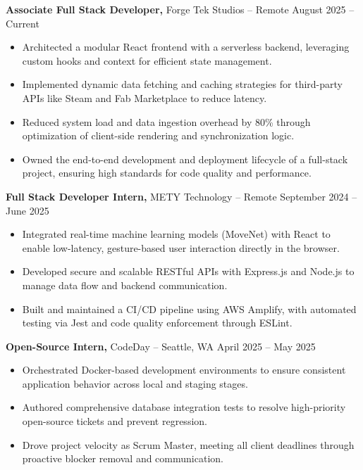 \documentclass[11pt]{article}       %
\begin{document}
\textbf{Associate Full Stack Developer,} {Forge Tek Studios} -- Remote \hfill August 2025 -- Current 
\vspace{-9pt}
\begin{itemize}
  \item Architected a modular React frontend with a serverless backend, leveraging custom hooks and context for efficient state management.
  \item Implemented dynamic data fetching and caching strategies for third-party APIs like Steam and Fab Marketplace to reduce latency.
  \item Reduced system load and data ingestion overhead by 80\% through optimization of client-side rendering and synchronization logic.
  \item Owned the end-to-end development and deployment lifecycle of a full-stack project, ensuring high standards for code quality and performance.
\end{itemize}

\textbf{Full Stack Developer Intern,} {METY Technology} -- Remote \hfill September 2024 -- June 2025 
\vspace{-9pt}
\begin{itemize}
  \item Integrated real-time machine learning models (MoveNet) with React to enable low-latency, gesture-based user interaction directly in the browser.
  \item Developed secure and scalable RESTful APIs with Express.js and Node.js to manage data flow and backend communication.
  \item Built and maintained a CI/CD pipeline using AWS Amplify, with automated testing via Jest and code quality enforcement through ESLint.
\end{itemize}

\textbf{Open-Source Intern,} {CodeDay} -- Seattle, WA \hfill April 2025 -- May 2025 \\
\vspace{-9pt}
\begin{itemize}
  \item Orchestrated Docker-based development environments to ensure consistent application behavior across local and staging stages.
  \item Authored comprehensive database integration tests to resolve high-priority open-source tickets and prevent regression.
  \item Drove project velocity as Scrum Master, meeting all client deadlines through proactive blocker removal and communication.
\end{itemize}
\end{document}

